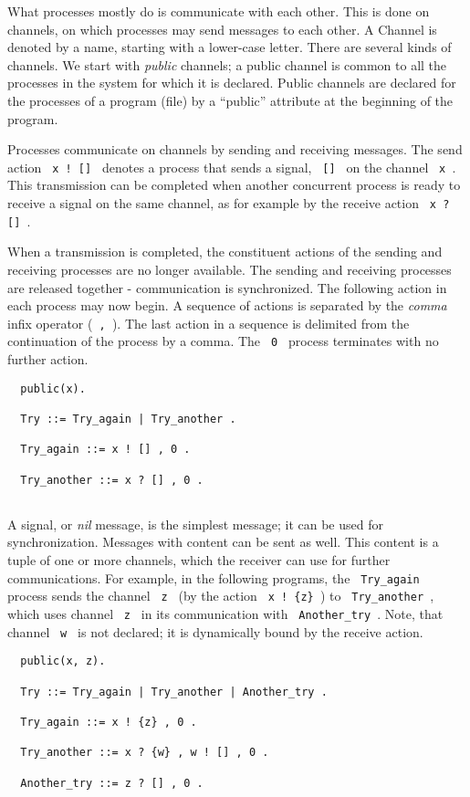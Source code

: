 What processes mostly do is communicate with each other. This is done
on channels, on which processes may send messages to each
other. A Channel is denoted by a name, starting with a lower-case
letter.  There are several kinds of channels. We start with {\em public}
channels; a public channel is common to all the processes in the system
for which it is declared. Public channels are declared for the
processes of a program (file) by a ``public'' attribute at the beginning
of the program.

Processes communicate on channels by sending and receiving
messages. The send action \verb+ x ! [] + denotes a process that
sends a signal, \verb+ [] + on the channel \verb+ x +. This
transmission can be completed when another concurrent process is ready
to receive a signal on the same channel, as for example by the receive
action \verb+ x ? [] +.

When a transmission is completed, the constituent actions of the
sending and receiving processes are no longer available.
The sending and receiving processes are released together -
communication is synchronized.  The following action in each process
may now begin.  A sequence of actions is separated by the {\em comma}
infix operator (\verb+ , +).  The last action in a sequence is
delimited from the continuation of the process by a comma.
The \verb+ 0 + process terminates with no further action.

\begin{verbatim}
  public(x).

  Try ::= Try_again | Try_another .

  Try_again ::= x ! [] , 0 .

  Try_another ::= x ? [] , 0 .
 
\end{verbatim}
 
A signal, or {\em nil} message, is the simplest message; it can be used
for synchronization. Messages with content can be sent as
well.  This content is a tuple of one or more channels, which the
receiver can use for further communications.  For example, in the
following programs, the \verb+ Try_again + process sends the channel
\verb+ z + (by the action \verb+ x ! {z} +) to \verb+ Try_another +,
which  uses channel  \verb+ z + in its communication with
\verb+ Another_try +.  Note, that channel \verb+ w + is not declared;
it is dynamically bound by the receive action.

\begin{verbatim}
  public(x, z).

  Try ::= Try_again | Try_another | Another_try .

  Try_again ::= x ! {z} , 0 .

  Try_another ::= x ? {w} , w ! [] , 0 .

  Another_try ::= z ? [] , 0 .
 
\end{verbatim}

